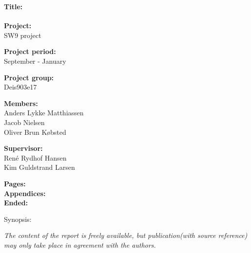 \begin{minipage}[t]{0.48\textwidth}
\textbf{Title:} \\[5pt]\hspace{2ex}
\\

\textbf{Project:} \\[5pt]\bigskip\hspace{2ex}
SW9 project

\textbf{Project period:} \\[5pt]\bigskip\hspace{2ex}
 September -  January

\textbf{Project group:} \\[5pt]\bigskip\hspace{2ex}
Deis903e17

\textbf{Members:} \\[5pt]\hspace*{2ex}
Anders Lykke Matthiassen \\\hspace*{2ex}
Jacob Nielsen \\\hspace*{2ex}
Oliver Brun Købsted 


\textbf{Supervisor:} \\[5pt]\hspace*{2ex}
René Rydhof Hansen\\[5pt]\hspace*{2ex}
Kim Guldstrand Larsen

\vspace*{1cm}

\textbf{Pages: } \\
\textbf{Appendices: } \\
\textbf{Ended: }

\end{minipage}
\hfill
\begin{minipage}[t]{0.483\textwidth}
Synopsis: \\[5pt]
\fbox{\parbox{7cm}{\bigskip\bigskip}}
\end{minipage}

\vfill

{\footnotesize\itshape The content of the report is freely available, but publication(with source reference) may only take place in agreement with the authors.}
